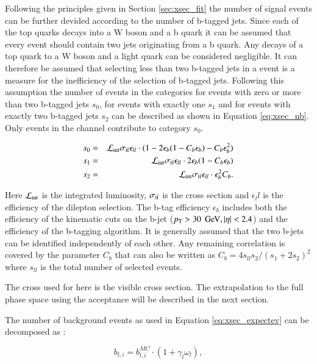 Following the principles given in Section \ref{sec:xsec_fit}  the number of signal events can be further devided according to the number of b-tagged jets.
Since each of the top quarks decays into a W boson and a b quark it can be assumed that every \ttbar event should contain two jets originating from a b quark.
Any decays of a top quark to a W boson and a light quark can be considered negligible.
It can therefore be assumed that selecting less than two b-tagged jets in a \ttbar event is a measure for the inefficiency of the selection of b-tagged jets.
Following this assumption the number of events in the categories for events with zero or more than two b-tagged jets $s_0$, for events with exactly one $s_1$ and for events with exactly two b-tagged jets $s_2$ can be described as shown in Equation \ref{eq:xsec_nb}. Only events in the \emu channel contribute to category $s_0$.

\begin{eqnarray}
s_0  &=& \mathcal{L}_{\rm int}\sigma_\mathrm{t\bar{t}} \epsilon_{ll} \cdot (1-2\epsilon_b(1-C_b\epsilon_b)-C_b\epsilon_b^2) \\
s_1  &=& \mathcal{L}_{\rm int} \sigma_\mathrm{t\bar{t}} \epsilon_{ll} \cdot 2 \epsilon_b(1-C_b\epsilon_b) \\
s_2  &=& \mathcal{L}_{\rm int} \sigma_\mathrm{t\bar{t}} \epsilon_{ll} \cdot   \epsilon_b^2 C_b 
\label{eq:xsec_nb}.
\end{eqnarray}

Here $\mathcal{L}_{\rm int}$ is the integrated luminosity, $\sigma_\mathrm{t\bar{t}}$ is the \ttbar cross section and $\epsilon_ll$ is the efficiency of the dilepton selection.
The b-tag efficiency $\epsilon_b$ includes both the efficiency of the kinematic cuts on the b-jet ($p_{\mathrm{T}} > 30\; \,\text{Ge\hspace{-.08em}V}, |\eta|<2.4$) and the efficiency of the b-tagging algorithm.
It is generally assumed that the two b-jets can be identified independently of each other. Any remaining correlation is covered by the parameter $C_b$ that can also be written as
$C_b=4s_{ll}s_2/(s_1+2s_2)^2$ where $s_{ll}$ is the total number of selected events. 

The cross used for here is the visible cross section. The extrapolation to the full phase space using the acceptance will be described in the next section.


The number of background events as used in Equation \ref{eq:xsec_expectev} can be decomposed as :

\begin{equation}
b_{l,i} = b_{l,i}^{MC} \cdot (1 + \gamma_l \omega_l),
\label{eq:nbli}
\end{equation}

